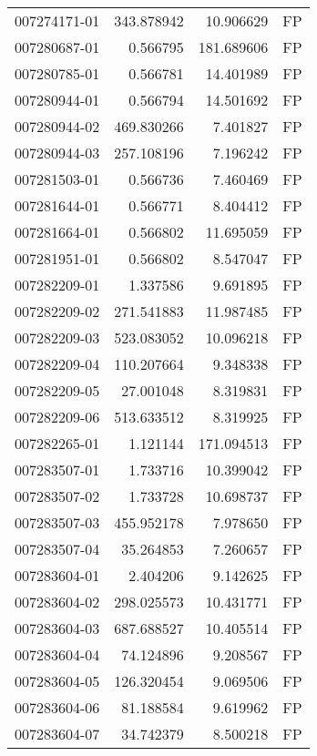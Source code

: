 \begin{tabular}{lrrl}
007274171-01 &  343.878942 &      10.906629 &   FP \\
007280687-01 &    0.566795 &     181.689606 &   FP \\
007280785-01 &    0.566781 &      14.401989 &   FP \\
007280944-01 &    0.566794 &      14.501692 &   FP \\
007280944-02 &  469.830266 &       7.401827 &   FP \\
007280944-03 &  257.108196 &       7.196242 &   FP \\
007281503-01 &    0.566736 &       7.460469 &   FP \\
007281644-01 &    0.566771 &       8.404412 &   FP \\
007281664-01 &    0.566802 &      11.695059 &   FP \\
007281951-01 &    0.566802 &       8.547047 &   FP \\
007282209-01 &    1.337586 &       9.691895 &   FP \\
007282209-02 &  271.541883 &      11.987485 &   FP \\
007282209-03 &  523.083052 &      10.096218 &   FP \\
007282209-04 &  110.207664 &       9.348338 &   FP \\
007282209-05 &   27.001048 &       8.319831 &   FP \\
007282209-06 &  513.633512 &       8.319925 &   FP \\
007282265-01 &    1.121144 &     171.094513 &   FP \\
007283507-01 &    1.733716 &      10.399042 &   FP \\
007283507-02 &    1.733728 &      10.698737 &   FP \\
007283507-03 &  455.952178 &       7.978650 &   FP \\
007283507-04 &   35.264853 &       7.260657 &   FP \\
007283604-01 &    2.404206 &       9.142625 &   FP \\
007283604-02 &  298.025573 &      10.431771 &   FP \\
007283604-03 &  687.688527 &      10.405514 &   FP \\
007283604-04 &   74.124896 &       9.208567 &   FP \\
007283604-05 &  126.320454 &       9.069506 &   FP \\
007283604-06 &   81.188584 &       9.619962 &   FP \\
007283604-07 &   34.742379 &       8.500218 &   FP \\

\end{tabular}
